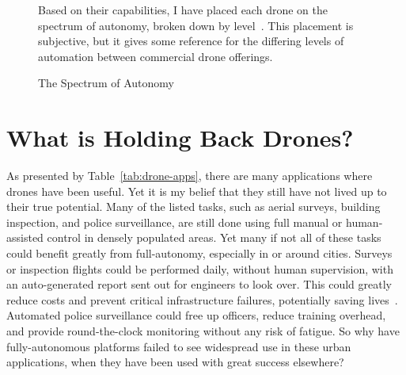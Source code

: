 \begin{figure}[]
    \begin{captext}
        \small Based on their capabilities, I have placed each drone on the spectrum of autonomy, broken down by level~\cite{Cloudfactory}. This placement is subjective, but it gives some reference for the differing levels of automation between commercial drone offerings.
    \end{captext}
    \caption{The Spectrum of Autonomy~\cite{Cidora,DJIAvata2,ParrotAnafi,DJIMini4,SkydioX10,Matrice30T}}
    \label{fig:spectrum}
\end{figure}

\section{What is Holding Back Drones?}
\label{sec:problems}
As presented by Table~\ref{tab:drone-apps}, there are many applications where drones have been useful. Yet it is my belief that they still have not lived up to their true potential. Many of the listed tasks, such as aerial surveys, building inspection, and police surveillance, are still done using full manual or human-assisted control in densely populated areas. Yet many if not all of these tasks could benefit greatly from full-autonomy, especially in or around cities. Surveys or inspection flights could be performed daily, without human supervision, with an auto-generated report sent out for engineers to look over. This could greatly reduce costs and prevent critical infrastructure failures, potentially saving lives~\cite{Dorafshan2018}. Automated police surveillance could free up officers, reduce training overhead, and provide round-the-clock monitoring without any risk of fatigue. So why have fully-autonomous platforms failed to see widespread use in these urban applications, when they have been used with great success elsewhere?

